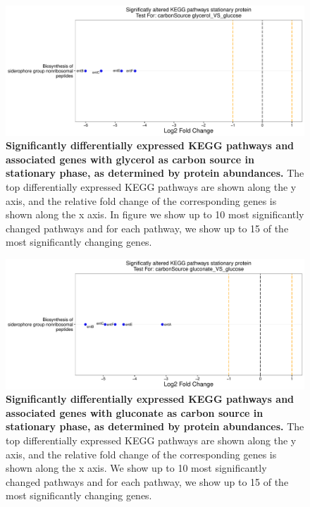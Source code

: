 \documentclass[a4paper]{article}
\begin{document}
\clearpage
\begin{figure}
	\includegraphics[width=1.0\textwidth]{../../d_figures/kegg_06.pdf}
	\caption[Significantly altered KEGG pathways for protein samples in stationary phase tested for glycerol against glucose]
	{\textbf{Significantly differentially expressed KEGG pathways and associated genes with glycerol as carbon source in stationary phase, as determined by protein abundances.} The top differentially expressed KEGG pathways are shown along the y axis, and the relative fold change of the corresponding genes is shown along the x axis. In figure we show up to 10 most significantly changed pathways and for each pathway, we show up to 15 of the most significantly changing genes.}
\end{figure}

\clearpage
\begin{figure}
	\includegraphics[width=1.0\textwidth]{../../d_figures/kegg_07.pdf}
	\caption[Significantly altered KEGG pathways for protein samples in stationary phase tested for gluconate against glucose]
	{\textbf{Significantly differentially expressed KEGG pathways and associated genes with gluconate as carbon source in stationary phase, as determined by protein abundances.} The top differentially expressed KEGG pathways are shown along the y axis, and the relative fold change of the corresponding genes is shown along the x axis. We show up to 10 most significantly changed pathways and for each pathway, we show up to 15 of the most significantly changing genes.}
\end{figure}
\end{document}
